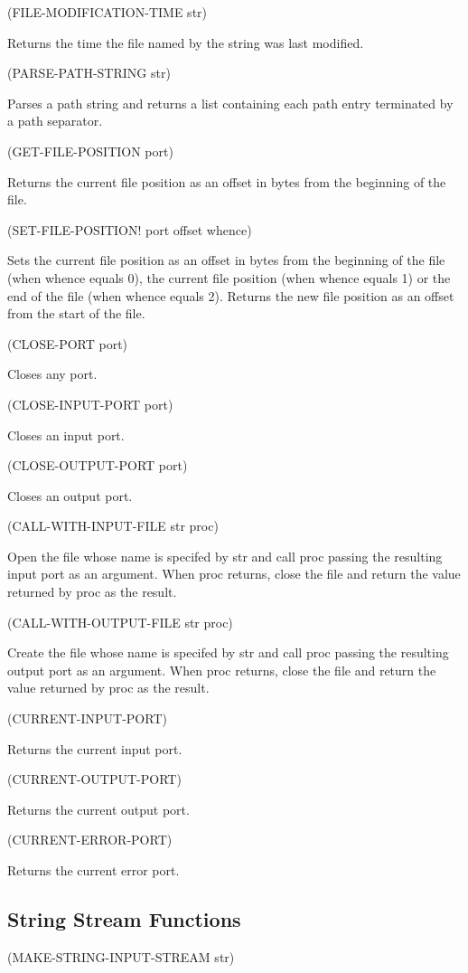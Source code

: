 \documentclass[11pt]{article}
\begin{document}
(FILE-MODIFICATION-TIME str)

Returns the time the file named by the string was last modified.

(PARSE-PATH-STRING str)

Parses a path string and returns a list containing each path entry
terminated by a path separator.

(GET-FILE-POSITION port)

Returns the current file position as an offset in bytes from the
beginning of the file.

(SET-FILE-POSITION! port offset whence)

Sets the current file position as an offset in bytes from the beginning
of the file (when whence equals 0), the current file position (when
whence equals 1) or the end of the file (when whence equals 2). Returns
the new file position as an offset from the start of the file.

(CLOSE-PORT port)

Closes any port.

(CLOSE-INPUT-PORT port)

Closes an input port.

(CLOSE-OUTPUT-PORT port)

Closes an output port.

(CALL-WITH-INPUT-FILE str proc)

Open the file whose name is specifed by str and call proc passing the
resulting input port as an argument. When proc returns, close the file
and return the value returned by proc as the result.

(CALL-WITH-OUTPUT-FILE str proc)

Create the file whose name is specifed by str and call proc passing the
resulting output port as an argument. When proc returns, close the file
and return the value returned by proc as the result.

(CURRENT-INPUT-PORT)

Returns the current input port.

(CURRENT-OUTPUT-PORT)

Returns the current output port.

(CURRENT-ERROR-PORT)

Returns the current error port.
\subsection{String Stream Functions}
\label{sec-1-40}

(MAKE-STRING-INPUT-STREAM str)
\end{document}
